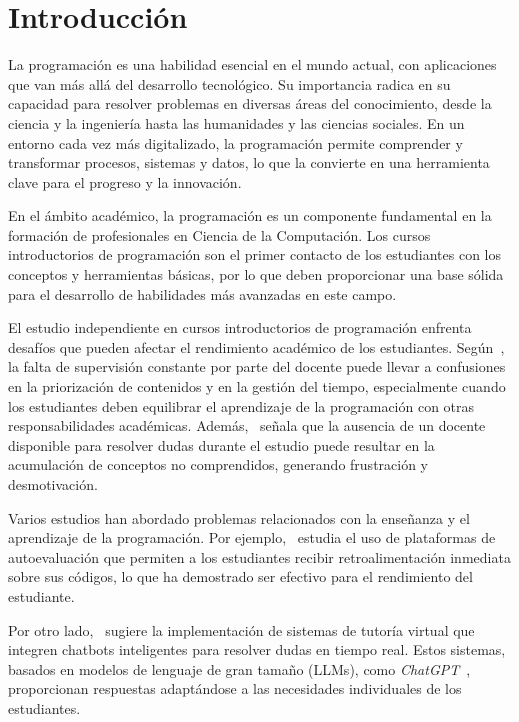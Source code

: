 \chapter*{Introducción}\label{chapter:introduction}

La programación es una habilidad esencial en el mundo actual, con aplicaciones que van más allá del desarrollo tecnológico. Su importancia radica en su capacidad para resolver problemas en diversas áreas del conocimiento, desde la ciencia y la ingeniería hasta las humanidades y las ciencias sociales. En un entorno cada vez más digitalizado, la programación permite comprender y transformar procesos, sistemas y datos, lo que la convierte en una herramienta clave para el progreso y la innovación.

En el ámbito académico, la programación es un componente fundamental en la formación de profesionales en Ciencia de la Computación. Los cursos introductorios de programación son el primer contacto de los estudiantes con los conceptos y herramientas básicas, por lo que deben proporcionar una base sólida para el desarrollo de habilidades más avanzadas en este campo.

El estudio independiente en cursos introductorios de programación enfrenta desafíos que pueden afectar el rendimiento académico de los estudiantes. Según~\cite{proskuraLytvynova2020}, la falta de supervisión constante por parte del docente puede llevar a confusiones en la priorización de contenidos y en la gestión del tiempo, especialmente cuando los estudiantes deben equilibrar el aprendizaje de la programación con otras responsabilidades académicas. Además,~\cite{overklift2019} señala que la ausencia de un docente disponible para resolver dudas durante el estudio puede resultar en la acumulación de conceptos no comprendidos, generando frustración y desmotivación.

Varios estudios han abordado problemas relacionados con la enseñanza y el aprendizaje de la programación. Por ejemplo,~\cite{Gabbay2022, Hanafi2023, Messer2024} estudia el uso de plataformas de autoevaluación que permiten a los estudiantes recibir retroalimentación inmediata sobre sus códigos, lo que ha demostrado ser efectivo para el rendimiento del estudiante.

Por otro lado,~\cite{dong2025buildaitutoradapt} sugiere la implementación de sistemas de tutoría virtual que integren chatbots inteligentes para resolver dudas en tiempo real. Estos sistemas, basados en modelos de lenguaje de gran tamaño (LLMs), como \textit{ChatGPT}~\cite{chatgpt}, proporcionan respuestas adaptándose a las necesidades individuales de los estudiantes.

